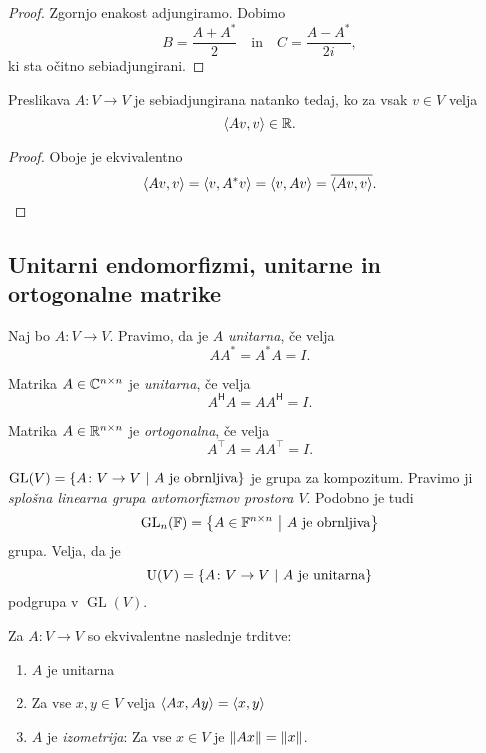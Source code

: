 \documentclass[12pt, a4paper]{article}
\begin{document}
\begin{proof}
Zgornjo enakost adjungiramo. Dobimo
\[
B=\frac{A+A^*}{2}\quad\text{in}\quad C=\frac{A-A^*}{2i},
\]
ki sta očitno sebiadjungirani.
\end{proof}

\begin{trditev}
Preslikava $A\colon V\to V$ je sebiadjungirana natanko tedaj, ko za vsak $v\in V$ velja
\[
\left\langle Av,v\right\rangle\in\mathbb{R}.
\]
\end{trditev}

\begin{proof}
Oboje je ekvivalentno
\[
\left\langle Av,v\right\rangle=\left\langle v,A^*v\right\rangle=\left\langle v,Av\right\rangle=\overline{\left\langle Av,v\right\rangle}.\qedhere
\]
\end{proof}

\newpage

\subsection{Unitarni endomorfizmi, unitarne in ortogonalne matrike}

\begin{okvir}
\begin{definicija}
Naj bo $A\colon V\to V$. Pravimo, da je $A$ \emph{unitarna}, če velja
\[
AA^*=A^*A=I.
\]
\end{definicija}

\begin{definicija}
Matrika $A\in\mathbb{C}^{n\times n}$ je \emph{unitarna}, če velja
\[
A^\mathsf{H}A=AA^\mathsf{H}=I.
\]
\end{definicija}

\begin{definicija}
Matrika $A\in\mathbb{R}^{n\times n}$ je \emph{ortogonalna}, če velja
\[
A^\top A=AA^\top=I.
\]
\end{definicija}
\end{okvir}

\begin{opomba}
$\operatorname{GL}(V)=\left\{A\colon V\to V~\middle\vert~\text{$A$ je obrnljiva}\right\}$ je grupa za kompozitum. Pravimo ji \emph{splošna linearna grupa avtomorfizmov prostora $V$}. Podobno je tudi
\[
\operatorname{GL}_n(\mathbb{F})=\left\{A\in\mathbb{F}^{n\times n}~\middle\vert~\text{$A$ je obrnljiva}\right\}
\]
grupa. Velja, da je
\[
\operatorname{U}(V)=\left\{A\colon V\to V~\middle\vert~\text{$A$ je unitarna}\right\}
\]
podgrupa v $\operatorname{GL}(V)$.
\end{opomba}

\begin{trditev}
Za $A\colon V\to V$ so ekvivalentne naslednje trditve:

\begin{enumerate}
\item $A$ je unitarna
\item Za vse $x,y\in V$ velja $\left\langle Ax,Ay\right\rangle=\left\langle x,y\right\rangle$
\item $A$ je \emph{izometrija}: Za vse $x\in V$ je $\left\lVert Ax\right\rVert=\left\lVert x\right\rVert$.
\end{enumerate}
\end{trditev}
\end{document}
